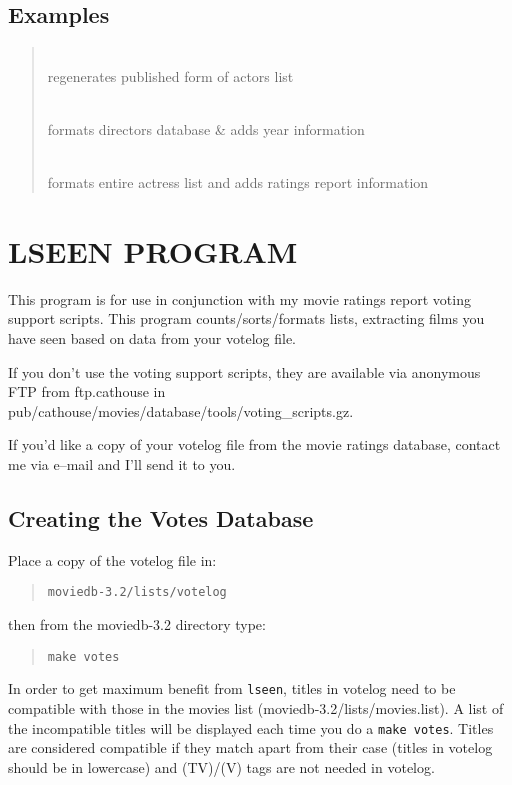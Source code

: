 \subsection{Examples}

\begin{quotation}
 \\
     regenerates published form of actors list
     
\\
     formats directors database \& adds year information
     
\\
     formats entire actress list and adds ratings report information
\end{quotation}

\clearpage
\section{LSEEN PROGRAM}

This program is for use in conjunction with my movie ratings report voting 
support scripts. This program counts/sorts/formats lists, extracting films 
you 
have seen based on data from your votelog file.

If you don't use the voting support scripts, they are available via 
anonymous
FTP from ftp.cathouse in pub/cathouse/movies/database/tools/voting\_scripts.gz.

If you'd like a copy of your votelog file from the movie ratings database,
contact me via e--mail and I'll send it to you.

\subsection{Creating the Votes Database}

Place a copy of the votelog file in:
\begin{quote}
{\tt moviedb-3.2/lists/votelog}
\end{quote}
then from the moviedb-3.2 directory type:
\begin{quote}
{\tt make votes}
\end{quote}

In order to get maximum benefit from {\tt lseen}, titles in votelog need 
to be
compatible with those in the movies list (moviedb-3.2/lists/movies.list). A
list of the incompatible titles will be displayed each time you do a 
{\tt make votes}. Titles are considered compatible if they match apart 
from 
their case (titles in votelog should be in lowercase) and (TV)/(V) tags
are not needed in votelog.

